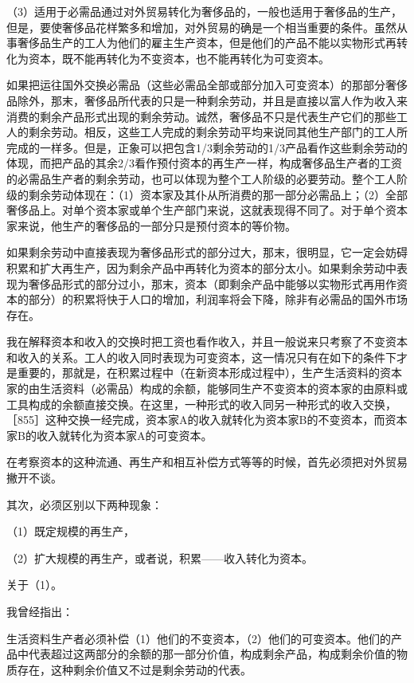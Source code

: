 （3）适用于必需品通过对外贸易转化为奢侈品的，一般也适用于奢侈品的生产，但是，要使奢侈品花样繁多和增加，对外贸易的确是一个相当重要的条件。虽然从事奢侈品生产的工人为他们的雇主生产资本，但是他们的产品不能以实物形式再转化为资本，既不能再转化为不变资本，也不能再转化为可变资本。

如果把运往国外交换必需品（这些必需品全部或部分加入可变资本）的那部分奢侈品除外，那末，奢侈品所代表的只是一种剩余劳动，并且是直接以富人作为收入来消费的剩余产品形式出现的剩余劳动。诚然，奢侈品不只是代表生产它们的那些工人的剩余劳动。相反，这些工人完成的剩余劳动平均来说同其他生产部门的工人所完成的一样多。但是，正象可以把包含1/3剩余劳动的1/3产品看作这些剩余劳动的体现，而把产品的其余2/3看作预付资本的再生产一样，构成奢侈品生产者的工资的必需品生产者的剩余劳动，也可以体现为整个工人阶级的必要劳动。整个工人阶级的剩余劳动体现在：（1）资本家及其仆从所消费的那一部分必需品上；（2）全部奢侈品上。对单个资本家或单个生产部门来说，这就表现得不同了。对于单个资本家来说，他生产的奢侈品的一部分只是预付资本的等价物。

如果剩余劳动中直接表现为奢侈品形式的部分过大，那末，很明显，它一定会妨碍积累和扩大再生产，因为剩余产品中再转化为资本的部分太小。如果剩余劳动中表现为奢侈品形式的部分过小，那末，资本（即剩余产品中能够以实物形式再用作资本的部分）的积累将快于人口的增加，利润率将会下降，除非有必需品的国外市场存在。


我在解释资本和收入的交换时把工资也看作收入，并且一般说来只考察了不变资本和收入的关系。工人的收入同时表现为可变资本，这一情况只有在如下的条件下才是重要的，那就是，在积累过程中（在新资本形成过程中），生产生活资料的资本家的由生活资料（必需品）构成的余额，能够同生产不变资本的资本家的由原料或工具构成的余额直接交换。在这里，一种形式的收入同另一种形式的收入交换，［855］这种交换一经完成，资本家A的收入就转化为资本家B的不变资本，而资本家B的收入就转化为资本家A的可变资本。

在考察资本的这种流通、再生产和相互补偿方式等等的时候，首先必须把对外贸易撇开不谈。

其次，必须区别以下两种现象：

（1）既定规模的再生产，

（2）扩大规模的再生产，或者说，积累——收入转化为资本。

关于（1）。

我曾经指出：

生活资料生产者必须补偿（1）他们的不变资本，（2）他们的可变资本。他们的产品中代表超过这两部分的余额的那一部分价值，构成剩余产品，构成剩余价值的物质存在，这种剩余价值又不过是剩余劳动的代表。

